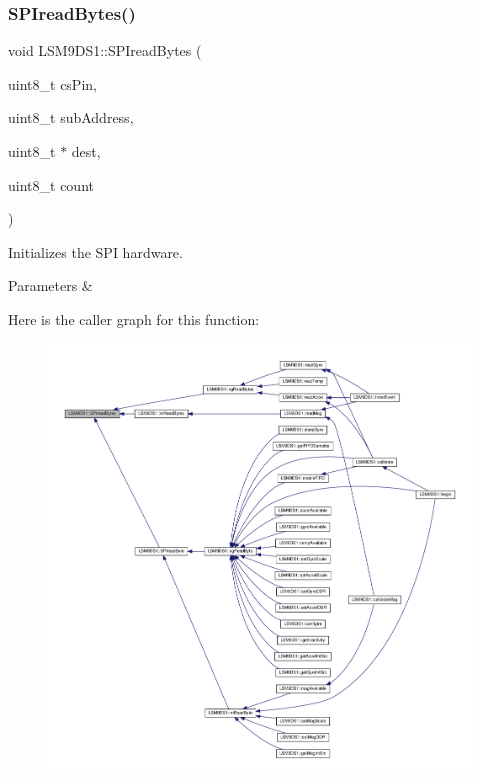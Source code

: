 \subsubsection{\texorpdfstring{S\+P\+Iread\+Bytes()}{SPIreadBytes()}}
{\footnotesize\ttfamily void L\+S\+M9\+D\+S1\+::\+S\+P\+Iread\+Bytes (\begin{DoxyParamCaption}\item[{uint8\+\_\+t}]{cs\+Pin,  }\item[{uint8\+\_\+t}]{sub\+Address,  }\item[{uint8\+\_\+t $\ast$}]{dest,  }\item[{uint8\+\_\+t}]{count }\end{DoxyParamCaption})\hspace{0.3cm}{\ttfamily [protected]}}



Initializes the S\+PI hardware. 


\begin{DoxyParams}{Parameters}
{\em } & \\
\hline
\end{DoxyParams}
Here is the caller graph for this function\+:\nopagebreak
\begin{figure}[H]
\begin{center}
\leavevmode
\includegraphics[width=350pt]{classLSM9DS1_a26c0f164454eba84e6486033b7061d11_icgraph}
\end{center}
\end{figure}
\mbox{\label{classLSM9DS1_a83321c9d6ec50f6b9944907d2be482cd}} 
